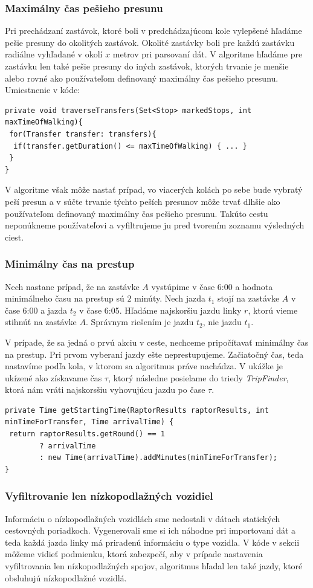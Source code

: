 \subsubsection{Maximálny čas pešieho presunu}
Pri prechádzaní zastávok, ktoré boli v predchádzajúcom kole vylepšené hľadáme pešie presuny do okolitých zastávok. Okolité zastávky boli pre každú zastávku radiálne vyhľadané v okolí $x$ metrov pri parsovaní dát. V algoritme hľadáme pre zastávku len také pešie presuny do iných zastávok, ktorých trvanie je menšie alebo rovné ako používateľom definovaný maximálny čas pešieho presunu. Umiestnenie v kóde:
\begin{lstlisting}
private void traverseTransfers(Set<Stop> markedStops, int maxTimeOfWalking){
 for(Transfer transfer: transfers){
  if(transfer.getDuration() <= maxTimeOfWalking) { ... }
 }
}
\end{lstlisting}
V algoritme však môže nastať prípad, vo viacerých kolách po sebe bude vybratý peší presun a v súčte trvanie týchto peších presunov môže trvať dlhšie ako používateľom definovaný maximálny čas pešieho presunu.
Takúto cestu neponúkneme používateľovi a vyfiltrujeme ju pred tvorením zoznamu výsledných ciest.

\subsubsection{Minimálny čas na prestup}
Nech nastane prípad, že na zastávke $A$ vystúpime v čase 6:00 a hodnota minimálneho času na prestup sú $2$ minúty. Nech jazda $t_1$ stojí na zastávke $A$ v čase 6:00 a jazda $t_2$ v čase 6:05. Hľadáme najskoršiu jazdu linky $r$, ktorú vieme stihnúť na zastávke $A$. Správnym riešením je jazdu $t_2$, nie jazdu $t_1$.

V prípade, že sa jedná o prvú akciu v ceste, nechceme pripočítavať minimálny čas na prestup. Pri prvom vyberaní jazdy ešte neprestupujeme. Začiatočný čas, teda nastavíme podľa kola, v ktorom sa algoritmus práve nachádza. V ukážke je ukízené ako získavame čas $\tau$, ktorý následne posielame do triedy \textit{TripFinder}, ktorá nám vráti najskorsšiu vyhovujúcu jazdu po čase $\tau$.
\begin{lstlisting}
private Time getStartingTime(RaptorResults raptorResults, int minTimeForTransfer, Time arrivalTime) {
 return raptorResults.getRound() == 1
        ? arrivalTime
        : new Time(arrivalTime).addMinutes(minTimeForTransfer);
}
\end{lstlisting} 

\subsubsection{Vyfiltrovanie len nízkopodlažných vozidiel}
Informáciu o nízkopodlažných vozidlách sme nedostali v dátach statických cestovných poriadkoch. Vygenerovali sme si ich náhodne pri importovaní dát a teda každá jazda linky má priradenú informáciu o type vozidla.
V kóde v sekcii \label{sec:trip-finding} môžeme vidieť podmienku, ktorá zabezpečí, aby v prípade nastavenia vyfiltrovania len nízkopodlažných spojov, algoritmus hľadal len také jazdy, ktoré obsluhujú nízkopodlažné vozidlá.

